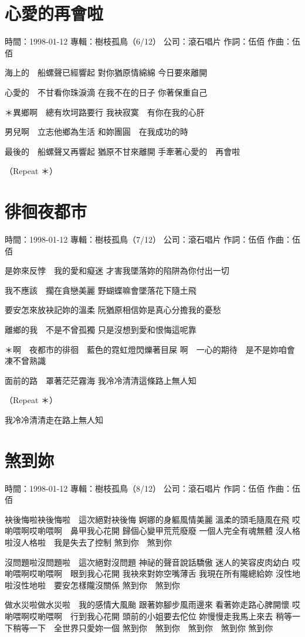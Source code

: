 \documentclass[UTF8,a4paper,oneside,twocolumn,12pt]{ctexbook}
\newcommand{\infopair}[2]{\textbullet #1：#2}
\newcommand{\zc}[1][伍佰]{\infopair{作詞}{#1}}
\newcommand{\zq}[1][伍佰]{\infopair{作曲}{#1}}
\newcommand{\zj}[1]{\infopair{專輯}{#1}}
\newcommand{\sj}[1]{\infopair{時間}{#1}}
\newcommand{\gs}[1]{\infopair{公司}{#1}}
\newenvironment{info}{\begin{flushleft}\kaishu
	}
	{\end{flushleft}\normalsize\yahei\par}
\newenvironment{lyric}{
	}
{}
\begin{document}
\section{心愛的再會啦}
\begin{info}
	\sj{1998-01-12}
	\zj{樹枝孤鳥（6/12）}
	\gs{滾石唱片}
	\zc
	\zq
\end{info}
\begin{lyric}
	海上的　船螺聲已經響起
	對你猶原情綿綿
	今日要來離開

	心愛的　不甘看你珠淚滴
	在我不在的日子
	你著保重自己

	＊異鄉啊　總有坎坷路要行
	我袂寂寞　有你在我的心肝

	男兒啊　立志他鄉為生活
	和妳團圓　在我成功的時

	最後的　船螺聲又再響起
	猶原不甘來離開
	手牽著心愛的　再會啦

	（Repeat ＊）
\end{lyric}

\section{徘徊夜都市}
\begin{info}
	\sj{1998-01-12}
	\zj{樹枝孤鳥（7/12）}
	\gs{滾石唱片}
	\zc
	\zq
\end{info}
\begin{lyric}
	是妳來反悖　我的愛和癡迷
	才害我墜落妳的陷阱為你付出一切

	我不應該　擱在貪戀美麗
	野蝴蝶嘛會墜落花下隨土飛

	要安怎來放袂記妳的溫柔
	阮猶原相信妳是真心分擔我的憂愁

	離鄉的我　不是不曾孤獨
	只是沒想到愛和恨悔這呢靠

	＊啊　夜都市的徘徊　藍色的霓虹燈閃爍著目屎
	啊　一心的期待　是不是妳咱會凍不曾熟識

	面前的路　罩著茫茫霧海
	我冷冷清清這條路上無人知

	（Repeat ＊）

	我冷冷清清走在路上無人知
\end{lyric}

\section{煞到妳}
\begin{info}
	\sj{1998-01-12}
	\zj{樹枝孤鳥（8/12）}
	\gs{滾石唱片}
	\zc
	\zq
\end{info}
\begin{lyric}
	袂後悔啦袂後悔啦　這次絕對袂後悔
	婀娜的身軀風情美麗
	溫柔的頭毛隨風在飛
	哎喲喂啊哎喲喂啊　鼻甲我心花開
	歸個心變甲荒荒廢廢
	一個人完全有魂無體
	沒人格啦沒人格啦　我是失去了控制
	煞到你　煞到你

	沒問題啦沒問題啦　這次絕對沒問題
	神祕的聲音說話驕傲
	迷人的笑容皮肉幼白
	哎喲喂啊哎喲喂啊　眼到我心花開
	我袂來對妳空嘴薄舌
	我現在所有隴總給妳
	沒性地啦沒性地啦　要安怎樣隴沒關係
	煞到你　煞到你

	做水災啦做水災啦　我的感情大風颱
	跟著妳腳步風雨邊來
	看著妳走路心脾開懷
	哎喲喂啊哎喲喂啊　行到我心花開
	頭前的小姐要去佗位
	妳慢慢走我馬上來去
	稍等一下稍等一下　全世界只愛妳一個
	煞到你　煞到你　煞到你　煞到你
	煞到你
\end{lyric}
\end{document}
